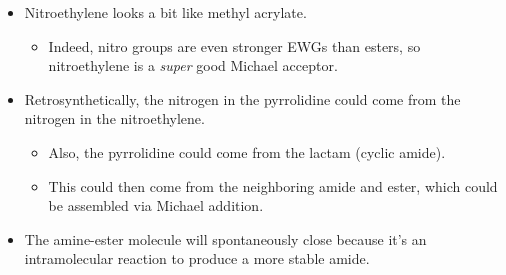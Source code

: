 \documentclass[../notes.tex]{subfiles}
\begin{document}
\begin{itemize}
            
    
    \begin{itemize}
        \item Nitroethylene looks a bit like methyl acrylate.
        \begin{itemize}
            \item Indeed, nitro groups are even stronger EWGs than esters, so nitroethylene is a \emph{super} good Michael acceptor.
        \end{itemize}
        \item Retrosynthetically, the nitrogen in the pyrrolidine could come from the nitrogen in the nitroethylene.
        \begin{itemize}
            \item Also, the pyrrolidine could come from the lactam (cyclic amide).
            \item This could then come from the neighboring amide and ester, which could be assembled via Michael addition.
        \end{itemize}
        \item The amine-ester molecule will spontaneously close because it's an intramolecular reaction to produce a more stable amide.
    \end{itemize}
\end{itemize}
\end{document}
